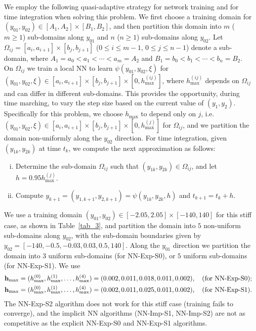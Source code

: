 We employ the following quasi-adaptive strategy for network training
and for time integration when solving this problem. We first choose a training domain
for $(y_{01},y_{02})\in[A_1,A_2]\times[B_1,B_2]$, and then partition this domain
into $m$ ($m\geqslant 1$) sub-domains along $y_{01}$ and
$n$ ($n\geqslant 1$) sub-domains along $y_{02}$.
Let $\Omega_{ij}=[a_i,a_{i+1}]\times[b_j,b_{j+1}]$ ($0\leqslant i\leqslant m-1$,
$0\leqslant j\leqslant n-1$) denote a sub-domain, where $A_1=a_0<a_1<\cdots<a_m=A_2$
and $B_1=b_0<b_1<\cdots<b_n=B_2$.
On $\Omega_{ij}$ we train a local NN  to learn $\psi(y_{01},y_{02},\xi)$
for  $(y_{01},y_{02},\xi)\in[a_i,a_{i+1}]\times[b_j,b_{j+1}]\times[0,h_{\max}^{(ij)}]$, where
$h_{\max}^{(ij)}$ depends on  $\Omega_{ij}$ and
can differ in different sub-domains. This provides the opportunity, during
time marching, to vary the step size based on the current value of $(y_1,y_2)$.
Specifically for this problem, we choose $h_{\max}$ to depend only on $j$,
i.e.~$(y_{01},y_{02},\xi)\in[a_i,a_{i+1}]\times[b_j,b_{j+1}]\times[0,h_{\max}^{(j)}]$
for $\Omega_{ij}$, and we partition the domain non-uniformly along
the $y_{02}$ direction.
%
For time integration, given $(y_{1k},y_{2k})$ at time $t_k$,
we compute the next approximation as follows:
\begin{enumerate}[(i)]
\item Determine the sub-domain $\Omega_{ij}$ such that $(y_{1k},y_{2k})\in\Omega_{ij}$,
  and let $h=0.95h_{\max}^{(j)}$.
\item Compute
  $y_{k+1}=(y_{1,k+1},y_{2,k+1})=\psi(y_{1k},y_{2k},h)$ and $t_{k+1}=t_k+h$.
\end{enumerate}

We use a training domain $(y_{01},y_{02})\in[-2.05,2.05]\times[-140,140]$ for this stiff case,
as shown in Table~\ref{tab_3}, and partition the domain into $5$ non-uniform
sub-domains along $y_{02}$, with the sub-domain boundaries
given by $y_{02}=[-140, -0.5, -0.03, 0.03, 0.5, 140]$.
Along the $y_{01}$ direction we partition the domain into $3$ uniform
sub-domains (for NN-Exp-S0), or $5$ uniform sub-domains (for NN-Exp-S1).
We use
\begin{equation*}
  \begin{split}
    &\mathbf{h}_{\max}=(h_{\max}^{(0)},h_{\max}^{(1)},\dots,h_{\max}^{(4)})
    =(0.002,0.011,0.018,0.011,0.002),
    \quad \text{(for NN-Exp-S0)}; \\
    & \mathbf{h}_{\max}=(h_{\max}^{(0)},h_{\max}^{(1)},\dots,h_{\max}^{(4)})
    =(0.002,0.011,0.025,0.011,0.002),
    \quad \text{(for NN-Exp-S1)}.
  \end{split}
\end{equation*}
The NN-Exp-S2 algorithm does not work for this stiff case (training fails to
converge), and
the implicit NN algorithms (NN-Imp-S1, NN-Imp-S2) are
not as competitive as the explicit NN-Exp-S0 and NN-Exp-S1 algorithms.


